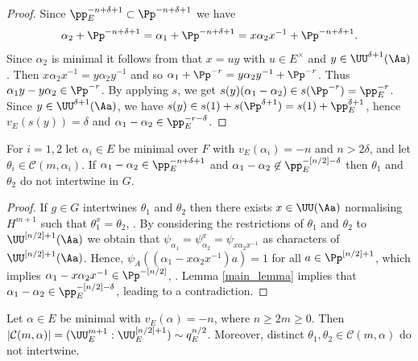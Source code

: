 \begin{proof} Since $\pp^{-n+\delta+1}_E\subset \Pp^{-n+\delta+1}$ we have
\[
\alpha_2+ \Pp^{-n+\delta+1} = \alpha_1 + \Pp^{-n+\delta+1}=x \alpha_2 x^{-1}+ \Pp^{-n+\delta+1}.
\]
Since $\alpha_2$ is minimal it follows from \cite[Th.\,2.4]{KM} that $x= u y$ with $u\in E^{\times}$ and $y\in \UU^{\delta+1}(\Aa)$. Then
$x \alpha_2 x^{-1}= y\alpha_2 y^{-1}$ and so
$ \alpha_1+ \Pp^{-r}= y \alpha_2 y^{-1} +\Pp^{-r}$. Thus $\alpha_1 y - y \alpha_2 \in \Pp^{-r}$. By applying $s$, we get
$s(y)( \alpha_1 - \alpha_2)\in s(\Pp^{-r})= \pp_E^{-r}$. Since $y\in \UU^{\delta+1}(\Aa)$, we have $s(y)\in s(1)+s(\Pp^{\delta+1})= s(1)+ \pp_E^{\delta+1}$, hence
$v_E(s(y))= \delta$ and $\alpha_1 - \alpha_2\in \pp_E^{-r-\delta}$.
\end{proof}

\begin{lem}\label{notinter} For $i=1, 2$ let $\alpha_i\in E$ be minimal over $F$ with $v_E(\alpha_i)=-n$ and $n> 2\delta$, and let $\theta_i\in \mathcal C(m, \alpha_i)$.
If $\alpha_1- \alpha_2\in \pp_E^{-n+\delta +1}$ and $\alpha_1-\alpha_2 \not\in \pp_E^{-[n/2]-\delta}$ then $\theta_1$ and $\theta_2$ do not intertwine in $G$.
\end{lem}

\begin{proof} If $g\in G$ intertwines $\theta_1$ and $\theta_2$ then there exists $x\in \UU(\Aa)$ normalising $H^{m+1}$ such that $\theta_1^x= \theta_2$, \cite[(3.5.11)]{BK}.
By considering the restrictions of $\theta_1$ and $\theta_2$ to $\UU^{[n/2]+1}(\Aa)$ we obtain that $\psi_{\alpha_1}= \psi^x_{\alpha_2}= \psi_{x \alpha_2 x^{-1}}$ as
characters of $\UU^{[n/2]+1}(\Aa)$. Hence, $\psi_A((\alpha_1 - x \alpha_2 x^{-1}) a)=1$ for all $a\in \Pp^{[n/2]+1}$, which implies $\alpha_1- x \alpha_2 x^{-1}\in \Pp^{-[n/2]}$,
\cite[p.\,22]{BK}. Lemma \ref{main_lemma} implies that $\alpha_1-\alpha_2 \in \pp_E^{-[n/2]-\delta}$, leading to a contradiction.
\end{proof}

\begin{lem}\label{single_alpha} Let $\alpha\in E$ be minimal with $v_E(\alpha)=-n$, where $n\ge 2m\ge 0$. Then $|\mathcal C(m, \alpha)| = (\UU^{m+1}_E : \UU^{[n/2]+1}_E)\sim q_E^{n/2}$.
Moreover, distinct $\theta_1, \theta_2\in \mathcal C(m, \alpha)$ do not intertwine.
\end{lem}

